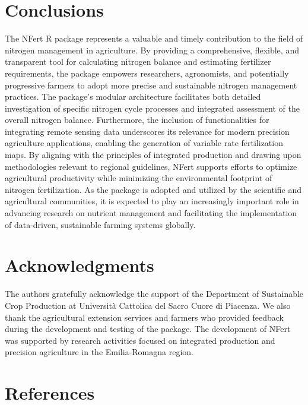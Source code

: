\documentclass[
  11pt,
]{article}
\begin{document}
\section{Conclusions}\label{conclusions}

The NFert R package represents a valuable and timely contribution to the
field of nitrogen management in agriculture. By providing a
comprehensive, flexible, and transparent tool for calculating nitrogen
balance and estimating fertilizer requirements, the package empowers
researchers, agronomists, and potentially progressive farmers to adopt
more precise and sustainable nitrogen management practices. The
package's modular architecture facilitates both detailed investigation
of specific nitrogen cycle processes and integrated assessment of the
overall nitrogen balance. Furthermore, the inclusion of functionalities
for integrating remote sensing data underscores its relevance for modern
precision agriculture applications, enabling the generation of variable
rate fertilization maps. By aligning with the principles of integrated
production and drawing upon methodologies relevant to regional
guidelines, NFert supports efforts to optimize agricultural productivity
while minimizing the environmental footprint of nitrogen fertilization.
As the package is adopted and utilized by the scientific and
agricultural communities, it is expected to play an increasingly
important role in advancing research on nutrient management and
facilitating the implementation of data-driven, sustainable farming
systems globally.

\section{Acknowledgments}\label{acknowledgments}

The authors gratefully acknowledge the support of the Department of
Sustainable Crop Production at Università Cattolica del Sacro Cuore di
Piacenza. We also thank the agricultural extension services and farmers
who provided feedback during the development and testing of the package.
The development of NFert was supported by research activities focused on
integrated production and precision agriculture in the Emilia-Romagna
region.

\section{References}\label{references}

  
\end{document}
